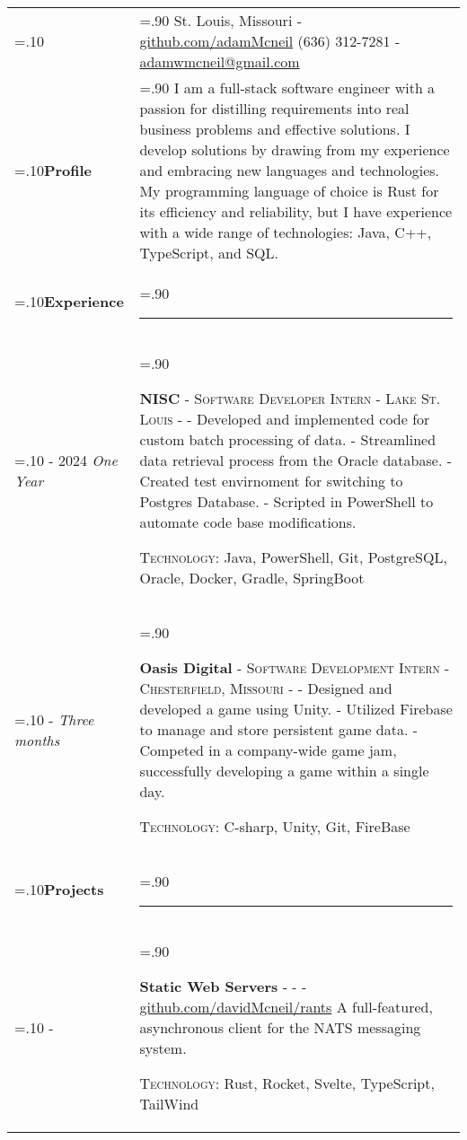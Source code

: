 \documentclass[10pt]{article}
\newcommand{\timeFrame}[3] {
  \if\relax\detokenize{#2}\relax
    #1
  \else
    #1 - #2
  \fi
  \newline
  \scriptsize \textit{#3}
}
\newcommand{\entry}[6] {
  \textbf{#1}
  \if\relax\detokenize{#2}\relax
  \else
       - \textsc{#2}
  \fi
  \if\relax\detokenize{#3}\relax
  \else
      - \textsc{#3}
  \fi
  \if\relax\detokenize{#4}\relax
  \else
      - \href{https://#4}{#4}
  \fi
  \newline #5
  \if\relax\detokenize{#6}\relax
  \else
      \newline \textsc{Technology:} #6
  \fi
  \\
}
\newcommand{\horizontalLine}[0] {
    \noindent\rule{.90\linewidth}{0.4pt}
}
\begin{document}

\begin{tabularx}{\linewidth}{>{\hsize=.10\hsize}X>{\hsize=.90\hsize}X}

{\bfseries\large Adam McNeil} &
St. Louis, Missouri - \href{https://github.com/adamMcneil}{github.com/adamMcneil}\newline
{(636) 312-7281 \hspace{5.5mm} - \href{mailto:adamwmcneil@gmail.com}{adamwmcneil@gmail.com}} \\[5pt]

\textbf{Profile} &
{I am a full-stack software engineer with a passion for distilling requirements into real business problems and effective solutions. I develop solutions by drawing from my experience and embracing new languages and technologies. My programming language of choice is Rust for its efficiency and reliability, but I have experience with a wide range of technologies: Java, C++, TypeScript, and SQL.
} \\

\textbf{Experience} & \horizontalLine \\

\timeFrame{2023}{2024}{One Year} &
\entry{NISC}
  {Software Developer Intern}
  {Lake St. Louis}
  {}
  {
  - Developed and implemented code for custom batch processing of data. \newline
  - Streamlined data retrieval process from the Oracle database. \newline
  - Created test envirnoment for switching to Postgres Database. \newline
  - Scripted in PowerShell to automate code base modifications.
  }
  {Java, PowerShell, Git, PostgreSQL, Oracle, Docker, Gradle, SpringBoot}

\timeFrame{2022}{}{Three months} &
\entry{Oasis Digital}
  {Software Development Intern}
  {Chesterfield, Missouri}
  {}
  {
  - Designed and developed a game using Unity. \newline
  - Utilized Firebase to manage and store persistent game data. \newline
  - Competed in a company-wide game jam, successfully developing a game within a single day.
  }
  {C-sharp, Unity, Git, FireBase}


\textbf{Projects} & \horizontalLine \\

\timeFrame{2019}{}{} &
\entry{Static Web Servers}
  {}
  {}
  {github.com/davidMcneil/rants}
  {
  A full-featured, asynchronous client for the NATS messaging system.
  }
  {Rust, Rocket, Svelte, TypeScript, TailWind}


\end{tabularx}
\end{document}
